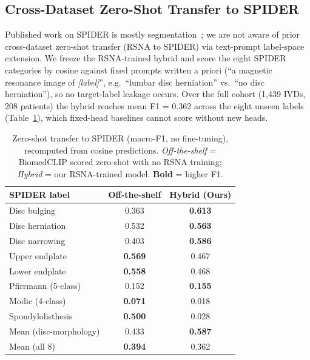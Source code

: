 \documentclass[runningheads]{llncs}
\newcommand{\best}[1]{\textbf{#1}}
\begin{document}
\subsection{Cross-Dataset Zero-Shot Transfer to SPIDER}

Published work on SPIDER is mostly segmentation~\cite{vandergraaf2024spider}; we are not aware of prior cross-dataset zero-shot transfer (RSNA to SPIDER) via text-prompt label-space extension. We freeze the RSNA-trained hybrid and score the eight SPIDER categories by cosine against fixed prompts written a priori (``a magnetic resonance image of \emph{[label]}'', e.g.\ ``lumbar disc herniation'' vs.\ ``no disc herniation''), so no target-label leakage occurs. Over the full cohort (1{,}439 IVDs, 208 patients) the hybrid reaches mean F1 = 0.362 across the eight unseen labels (Table~\ref{tab:spider}), which fixed-head baselines cannot score without new heads.

\begin{table}[htbp]
\centering
\caption{Zero-shot transfer to SPIDER (macro-F1, no fine-tuning), recomputed from cosine predictions. \emph{Off-the-shelf} = BiomedCLIP scored zero-shot with no RSNA training; \emph{Hybrid} = our RSNA-trained model. \textbf{Bold} = higher F1.}
\label{tab:spider}
\begin{tabular}{@{}lcc@{}}
\toprule
\textbf{SPIDER label}              & \textbf{Off-the-shelf} & \textbf{Hybrid (Ours)} \\
\midrule
Disc bulging              & 0.363 & \best{0.613} \\
Disc herniation           & 0.532 & \best{0.563} \\
Disc narrowing            & 0.403 & \best{0.586} \\
\midrule
Upper endplate            & \best{0.569} & 0.467 \\
Lower endplate            & \best{0.558} & 0.468 \\
Pfirrmann (5-class)       & 0.152 & \best{0.155} \\
Modic (4-class)           & \best{0.071} & 0.018 \\
Spondylolisthesis         & \best{0.500} & 0.028 \\
\midrule
Mean (disc-morphology)    & 0.433 & \best{0.587} \\
Mean (all 8)              & \best{0.394} & 0.362 \\
\bottomrule
\end{tabular}
\end{table}
\end{document}
